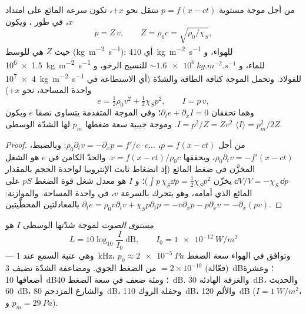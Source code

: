 \begin{proposition}\label{prop:b2:sound-waves:plane}
من أجل موجة مستوية $p = f(x - ct)$ تنتقل نحو $+x$، تكون سرعة
المائع على امتداد $x$، في طور ، ويكون
\[
p = Z\,v , \qquad Z = \rho_0c = \sqrt{\rho_0/\chi_S} ,
\]
حيث $Z$ هي \emph{} للوسط
(\unit{kg.m^{-2}.s^{-1}}): أي \qty{410}{kg.m^{-2}.s^{-1}} للهواء، و \qty{1.5e6}{kg.m^{-2}.s^{-1}}
للماء، و $\sim\qty{1.6e6}{kg.m^{-2}.s^{-1}}$ للنسيج الرخو،
و \qty{4e7}{kg.m^{-2}.s^{-1}} للفولاذ. وتحمل الموجة كثافة الطاقة
والشدّة (أي الاستطاعة في واحدة المساحة، نحو $+x$)
\[
e = \tfrac12\rho_0v^2 + \tfrac12\chi_Sp^2 , \qquad I = p\,v ,
\]
وهما تحققان $\partial_te + \partial_xI = 0$؛ وفي الموجة المتقدمة يتساوى
نصفا $e$ ويكون $I = p^2/Z = Zv^2$. وموجة جيبية سعة
ضغطها $p_m$ لها الشدّة الوسطى $\langle I\rangle = p_m^2/2Z$.
\end{proposition}

\begin{proof}
من أجل $p = f(x - ct)$، $\rho_0\partial_tv = -\partial_xp = f'/c\cdot c\dots$: وبالضبط،
$\rho_0\partial_tv = -f'(x - ct)$، ويحققها $v = f(x - ct)/\rho_0c$. والحدّ
الكامن في $e$ هو الشغل المخزَّن في ضغط المائع
(إذ انضغاط ثابت الإنتروبيا لواحدة الحجم بالمقدار $\dd V/V = -\chi_S\,\dd p$
يخزّن $\int p\,\chi_S\dd p = \tfrac12\chi_Sp^2$)؛ و $I$ هو معدل شغل قوة
الضغط $pS$ على المائع الذي أمامه، وهو يتحرك بالسرعة $v$، في واحدة المساحة.
والموازنة: $\partial_te = \rho_0v\partial_tv + \chi_Sp\partial_tp = -v\partial_xp - p\partial_xv =
-\partial_x(pv)$ بالمعادلتين المخطَّيتين.
\end{proof}

\begin{definition}\label{def:b2:sound-waves:decibel}
\emph{مستوى الصوت} لموجة شدّتها الوسطى $I$ هو
\[
L = 10\log_{10}\frac I{I_0} \ \text{dB} , \qquad I_0 = \qty{1e-12}{W/m^2}
\]
--- وهي عتبة السمع عند \qty{1}{kHz}، وتوافق في الهواء
سعة الضغط $p_0 \approx \qty{2e-5}{Pa}$ (فعّالة) $= 2 \times 10^{-10}$ من
الضغط الجوي. ومضاعفة الشدّة تضيف \qty{3}{dB}؛ وعشرة أضعافها \qty{10}{dB}؛
ومئة ضعف في سعة الضغط \qty{40}{dB}. والغرفة الهادئة
\qty{30}{dB}، والحديث \qty{60}{dB}، والشارع المزدحم \qty{80}{dB}، وحفلة الروك
\qty{110}{dB}، والألم \qty{120}{dB} ($I = \qty{1}{W/m^2}$، و $p_m = \qty{29}{Pa}$).
\end{definition}

